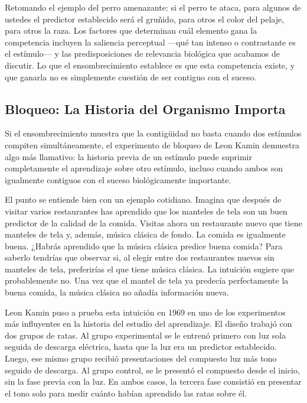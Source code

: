 \documentclass[
  letterpaper,
  DIV=11,
  numbers=noendperiod]{scrreprt}
\begin{document}
\begin{tcolorbox}[enhanced jigsaw, arc=.35mm, bottomrule=.15mm, breakable, colback=white, colframe=quarto-callout-note-color-frame, left=2mm, leftrule=.75mm, opacityback=0, rightrule=.15mm, toprule=.15mm]
Retomando el ejemplo del perro amenazante: si el perro te ataca, para
algunos de ustedes el predictor establecido será el gruñido, para otros
el color del pelaje, para otros la raza. Los factores que determinan
cuál elemento gana la competencia incluyen la saliencia perceptual
---qué tan intenso o contrastante es el estímulo--- y las
predisposiciones de relevancia biológica que acabamos de discutir. Lo
que el ensombrecimiento establece es que esta competencia existe, y que
ganarla no es simplemente cuestión de ser contiguo con el suceso.

\subsection{Bloqueo: La Historia del Organismo
Importa}\label{bloqueo-la-historia-del-organismo-importa}

Si el ensombrecimiento muestra que la contigüidad no basta cuando dos
estímulos compiten simultáneamente, el experimento de bloqueo de Leon
Kamin demuestra algo más llamativo: la historia previa de un estímulo
puede suprimir completamente el aprendizaje sobre otro estímulo, incluso
cuando ambos son igualmente contiguos con el suceso biológicamente
importante.

El punto se entiende bien con un ejemplo cotidiano. Imagina que después
de visitar varios restaurantes has aprendido que los manteles de tela
son un buen predictor de la calidad de la comida. Visitas ahora un
restaurante nuevo que tiene manteles de tela y, además, música clásica
de fondo. La comida es igualmente buena. ¿Habrás aprendido que la música
clásica predice buena comida? Para saberlo tendrías que observar si, al
elegir entre dos restaurantes nuevos sin manteles de tela, preferirías
el que tiene música clásica. La intuición sugiere que probablemente no.
Una vez que el mantel de tela ya predecía perfectamente la buena comida,
la música clásica no añadía información nueva.

Leon Kamin puso a prueba esta intuición en 1969 en uno de los
experimentos más influyentes en la historia del estudio del aprendizaje.
El diseño trabajó con dos grupos de ratas. Al grupo experimental se le
entrenó primero con luz sola seguida de descarga eléctrica, hasta que la
luz era un predictor establecido. Luego, ese mismo grupo recibió
presentaciones del compuesto luz más tono seguido de descarga. Al grupo
control, se le presentó el compuesto desde el inicio, sin la fase previa
con la luz. En ambos casos, la tercera fase consistió en presentar el
tono solo para medir cuánto habían aprendido las ratas sobre él.


\end{tcolorbox}
\end{document}
